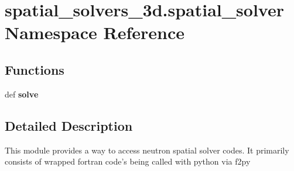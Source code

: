 \hypertarget{namespacespatial__solvers__3d_1_1spatial__solver}{\section{spatial\+\_\+solvers\+\_\+3d.\+spatial\+\_\+solver Namespace Reference}
\label{namespacespatial__solvers__3d_1_1spatial__solver}
}
\subsection*{Functions}
\begin{DoxyCompactItemize}
\item 
\hypertarget{namespacespatial__solvers__3d_1_1spatial__solver_a0415c6be183412b48ecdd6f5705db882}{def {\bfseries solve}}\label{namespacespatial__solvers__3d_1_1spatial__solver_a0415c6be183412b48ecdd6f5705db882}

\end{DoxyCompactItemize}


\subsection{Detailed Description}
\begin{DoxyVerb}This module provides a way to access neutron spatial solver codes.  It primarily consists of wrapped fortran code's being called with python via f2py\end{DoxyVerb}
 